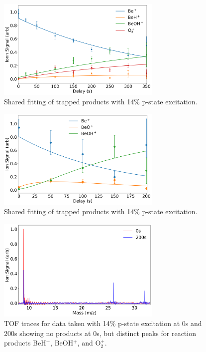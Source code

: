 
\begin{figure}[H]
	\centering
	\includegraphics[width=0.7\textwidth]{images/Be_O2_laser_fit.png}
	\caption{\label{fig: laser fit} Shared fitting of trapped products with 14\% p-state excitation.}
\end{figure}

\begin{figure}[H]
	\centering
	\includegraphics[width=0.7\textwidth]{images/Be_O2_no_laser_fit.png}
	\caption{\label{fig: no laser fit} Shared fitting of trapped products with 14\% p-state excitation.}
\end{figure}

\begin{figure}[H]
	\centering
	\includegraphics[width=0.7\textwidth]{images/Be_O2_laser_TOF.png}
	\caption{\label{fig: laser TOF} TOF traces for data taken with 14\% p-state excitation at 0s and 200s showing no products at 0s, but distinct peaks for reaction products BeH$^+$, BeOH$^+$, and O$_2^+$.}
\end{figure}

